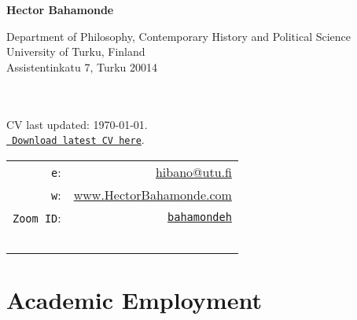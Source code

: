 \documentclass[letterpaper]{article}
\def\name{Hector Bahamonde}
\begin{document}
\centerline{\huge \bf \name}

\vspace{0.25in}

\begin{minipage}{0.45\linewidth}
 Department of Philosophy, Contemporary History and Political Science\\
 University of Turku, Finland\\
 Assistentinkatu 7, Turku 20014\\
  \\
  \\
\begin{footnotesize}
CV last updated: \today. \\
\href{http://github.com/hbahamonde/Job_Market/raw/master/Bahamonde_CV.pdf}{\texttt{{\color{red} Download latest CV here}}}.%
\end{footnotesize}

\end{minipage}
 \hspace{\fill}\begin{minipage}{0.35\linewidth}
  \begin{tabular}{rr}
    \texttt{e}: & \href{mailto:hibano@utu.fi}{hibano@utu.fi} \\
    \texttt{w}: & \href{http://www.hectorbahamonde.com}{www.HectorBahamonde.com}\\
    \texttt{Zoom ID}: & \href{https://utu.zoom.us/my/bahamondeh}{\texttt{bahamondeh}}\\
    \\
    \\
    \\
    \\
    \\
  \end{tabular}
\end{minipage}


{\unskip}


\section*{Academic Employment}
\end{document}
